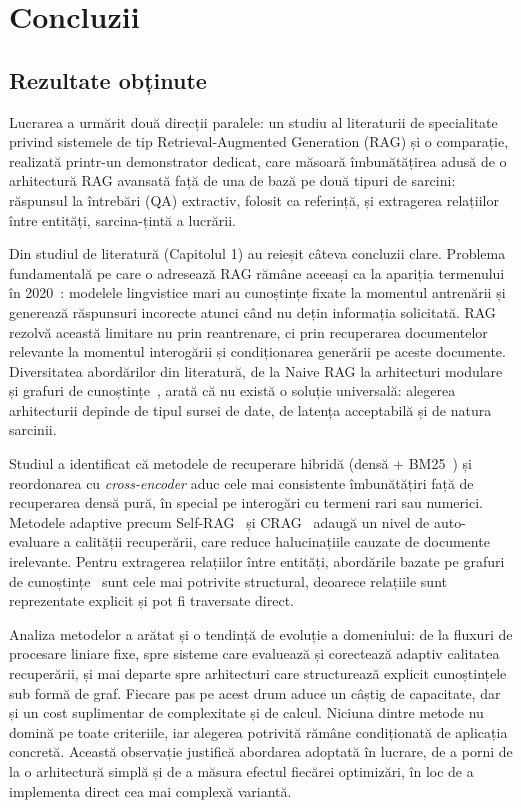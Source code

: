 \chapter*{Concluzii}

\section*{Rezultate obținute}

Lucrarea a urmărit două direcții paralele: un studiu al literaturii de specialitate privind sistemele de tip Retrieval-Augmented Generation (RAG) și o comparație, realizată printr-un demonstrator dedicat, care măsoară îmbunătățirea adusă de o arhitectură RAG avansată față de una de bază pe două tipuri de sarcini: răspunsul la întrebări (QA) extractiv, folosit ca referință, și extragerea relațiilor între entități, sarcina-țintă a lucrării.

Din studiul de literatură (Capitolul 1) au reieșit câteva concluzii clare. Problema fundamentală pe care o adresează RAG rămâne aceeași ca la apariția termenului în 2020~\cite{lewis2020rag}: modelele lingvistice mari au cunoștințe fixate la momentul antrenării și generează răspunsuri incorecte atunci când nu dețin informația solicitată. RAG rezolvă această limitare nu prin reantrenare, ci prin recuperarea documentelor relevante la momentul interogării și condiționarea generării pe aceste documente. Diversitatea abordărilor din literatură, de la Naive RAG la arhitecturi modulare și grafuri de cunoștințe~\cite{gao2024retrievalaugmentedgenerationlargelanguage,peng2025graph}, arată că nu există o soluție universală: alegerea arhitecturii depinde de tipul sursei de date, de latența acceptabilă și de natura sarcinii.

Studiul a identificat că metodele de recuperare hibridă (densă + BM25~\cite{robertson2009bm25}) și reordonarea cu \textit{cross-encoder} aduc cele mai consistente îmbunătățiri față de recuperarea densă pură, în special pe interogări cu termeni rari sau numerici. Metodele adaptive precum Self-RAG~\cite{asai2023self} și CRAG~\cite{yan2024crag} adaugă un nivel de auto-evaluare a calității recuperării, care reduce halucinațiile cauzate de documente irelevante. Pentru extragerea relațiilor între entități, abordările bazate pe grafuri de cunoștințe~\cite{edge2024graphrag} sunt cele mai potrivite structural, deoarece relațiile sunt reprezentate explicit și pot fi traversate direct.

Analiza metodelor a arătat și o tendință de evoluție a domeniului: de la fluxuri de procesare liniare fixe, spre sisteme care evaluează și corectează adaptiv calitatea recuperării, și mai departe spre arhitecturi care structurează explicit cunoștințele sub formă de graf. Fiecare pas pe acest drum aduce un câștig de capacitate, dar și un cost suplimentar de complexitate și de calcul. Niciuna dintre metode nu domină pe toate criteriile, iar alegerea potrivită rămâne condiționată de aplicația concretă. Această observație justifică abordarea adoptată în lucrare, de a porni de la o arhitectură simplă și de a măsura efectul fiecărei optimizări, în loc de a implementa direct cea mai complexă variantă.

